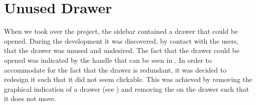 
\section{Unused Drawer}
\label{sec:unused_drawer}

When we took over the \launcher project, the sidebar contained a drawer that could be opened. During the development it was discovered, by contact with the users, that the drawer was unused and undesired. The fact that the drawer could be opened was indicated by the handle that can be seen in . In order to accommodate for the fact that the drawer is redundant, it was decided to redesign it such that it did not seem clickable. This was achieved by removing the graphical indication of a drawer (see ) and removing the  on the drawer such that it does not move.  